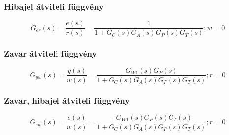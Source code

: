 \documentclass[11pt,a4paper]{article}
\begin{document}
\subsubsection{Hibajel átviteli függvény}
$$G_{er}\left(s\right) = \frac{e\left(s\right)}{r\left(s\right)} = \frac{1}{1+G_C\left(s\right)G_A\left(s\right)G_P\left(s\right)G_T\left(s\right)}; w = 0$$
\subsubsection{Zavar átviteli függvény}
$$G_{yw}\left(s\right) = \frac{y\left(s\right)}{w\left(s\right)} = \frac{G_{W1}\left(s\right)G_P\left(s\right)}{1+G_C\left(s\right)G_A\left(s\right)G_P\left(s\right)G_T\left(s\right)}; r = 0$$
\subsubsection{Zavar, hibajel átviteli függvény}
$$G_{ew}\left(s\right) = \frac{e\left(s\right)}{w\left(s\right)} = \frac{-G_{W1}\left(s\right)G_P\left(s\right)G_T\left(s\right)}{1+G_C\left(s\right)G_A\left(s\right)G_P\left(s\right)G_T\left(s\right)}; r = 0$$
\end{document}
